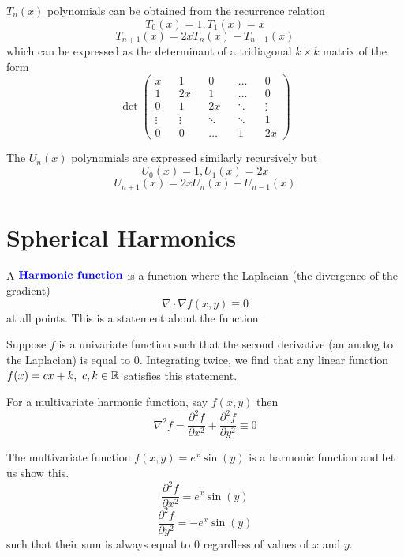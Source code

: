 \documentclass[12pt]{scrartcl}
\begin{document}
\begin{lemma}
    $T_n(x)$ polynomials can be obtained from the recurrence relation 
\[T_0(x) = 1, T_1(x) = x\]
\[T_{n+1}(x) = 2xT_n(x) - T_{n-1}(x)\]
which can be expressed as the determinant of a tridiagonal $k \times k$ matrix of the form
\[\det\begin{pmatrix}
    x && 1 && 0 && \hdots && 0\\
    1 && 2x && 1 && \hdots && 0\\
    0 && 1 && 2x && \ddots && \vdots\\
    \vdots && \vdots && \ddots && \ddots && 1\\
    0 && 0 && \hdots && 1 && 2x
\end{pmatrix}\]
\end{lemma}

\begin{lemma}
    The $U_n(x)$ polynomials are expressed similarly recursively but 
\[U_0(x) = 1, U_1(x) = 2x\]
\[U_{n+1}(x) = 2x U_n(x) - U_{n-1}(x)\]
\end{lemma}

\section{Spherical Harmonics}

\begin{definition}
    A $\textbf{\color{blue} Harmonic function}$ is a function where the Laplacian (the divergence of the gradient)
    \[\nabla \cdot \nabla f(x,y) \equiv 0\]
    at all points. This is a statement about the function.
\end{definition}

\begin{note}
    Suppose $f$ is a univariate function such that the second derivative (an analog to the Laplacian) is equal to 0. Integrating twice, we find that any linear function $f(x) = cx + k, \ c, k \in \mathbb R$ satisfies this statement.
\end{note}

\begin{note}
    For a multivariate harmonic function, say $f(x,y)$ then 
\[\nabla^2f = \frac{\partial^2 f}{\partial x^2} + \frac{\partial^2 f }{\partial y^2} \equiv 0\]
\end{note}

\begin{example}
    The multivariate function $f(x,y) = e^x \sin(y)$ is a harmonic function and let us show this.
\[\frac{\partial^2 f}{\partial x^2} = e^x\sin(y)\]
\[\frac{\partial^2 f}{\partial y^2} = -e^x\sin(y)\]
such that their sum is always equal to 0 regardless of values of $x$ and $y$.
\end{example}
\end{document}
